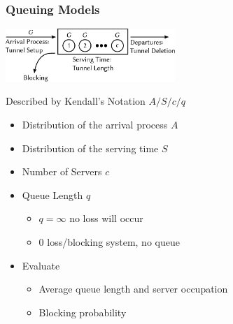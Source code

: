 \documentclass{beamer}
\begin{document}
\begin{frame}
	\frametitle{Queuing Models}

	\begin{center}
		\includegraphics[height=2cm]{../../chapters/04-mobilenets/images/GGn-model.pdf}
	\end{center}

	Described by Kendall's Notation $A/S/c/q$
	\begin{itemize}
	\item Distribution of the arrival process $A$
	\item Distribution of the serving time $S$
	\item Number of Servers $c$
	\item Queue Length $q$
	\begin{itemize}
		\item $q=\infty$ no loss will occur
		\item $0$ loss/blocking system, no queue
	\end{itemize}
	\item Evaluate
		\begin{itemize}
			\item Average queue length and server occupation
			\item Blocking probability
		\end{itemize}
	\end{itemize}
\end{frame}

\setcounter{framenumber}{\value{finalframe}}
\end{document}
